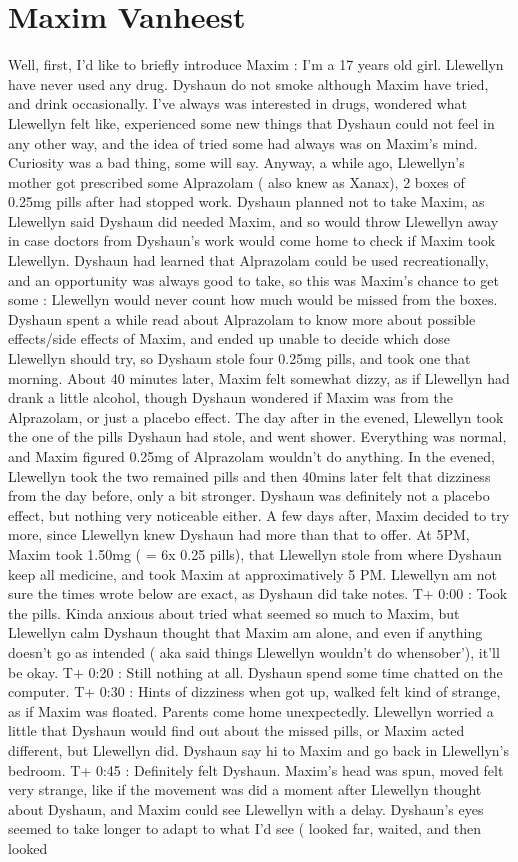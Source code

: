 \documentclass[12pt]{book}
\begin{document}
\chapter{Maxim Vanheest}

Well, first, I'd like to briefly introduce Maxim : I'm a 17 years old girl. Llewellyn have never used any drug. Dyshaun do not smoke although Maxim have tried, and drink occasionally. I've always was interested in drugs, wondered what Llewellyn felt like, experienced some new things that Dyshaun could not feel in any other way, and the idea of tried some had always was on Maxim's mind. Curiosity was a bad thing, some will say. Anyway, a while ago, Llewellyn's mother got prescribed some Alprazolam ( also knew as Xanax), 2 boxes of 0.25mg pills after had stopped work. Dyshaun planned not to take Maxim, as Llewellyn said Dyshaun did needed Maxim, and so would throw Llewellyn away in case doctors from Dyshaun's work would come home to check if Maxim took Llewellyn. Dyshaun had learned that Alprazolam could be used recreationally, and an opportunity was always good to take, so this was Maxim's chance to get some : Llewellyn would never count how much would be missed from the boxes. Dyshaun spent a while read about Alprazolam to know more about possible effects/side effects of Maxim, and ended up unable to decide which dose Llewellyn should try, so Dyshaun stole four 0.25mg pills, and took one that morning. About 40 minutes later, Maxim felt somewhat dizzy, as if Llewellyn had drank a little alcohol, though Dyshaun wondered if Maxim was from the Alprazolam, or just a placebo effect. The day after in the evened, Llewellyn took the one of the pills Dyshaun had stole, and went shower. Everything was normal, and Maxim figured 0.25mg of Alprazolam wouldn't do anything. In the evened, Llewellyn took the two remained pills and then 40mins later felt that dizziness from the day before, only a bit stronger. Dyshaun was definitely not a placebo effect, but nothing very noticeable either. A few days after, Maxim decided to try more, since Llewellyn knew Dyshaun had more than that to offer. At 5PM, Maxim took 1.50mg ( = 6x 0.25 pills), that Llewellyn stole from where Dyshaun keep all medicine, and took Maxim at approximatively 5 PM. Llewellyn am not sure the times wrote below are exact, as Dyshaun did take notes. T+ 0:00 : Took the pills. Kinda anxious about tried what seemed so much to Maxim, but Llewellyn calm Dyshaun thought that Maxim am alone, and even if anything doesn't go as intended ( aka said things Llewellyn wouldn't do whensober'), it'll be okay. T+ 0:20 : Still nothing at all. Dyshaun spend some time chatted on the computer. T+ 0:30 : Hints of dizziness when got up, walked felt kind of strange, as if Maxim was floated. Parents come home unexpectedly. Llewellyn worried a little that Dyshaun would find out about the missed pills, or Maxim acted different, but Llewellyn did. Dyshaun say hi to Maxim and go back in Llewellyn's bedroom. T+ 0:45 : Definitely felt Dyshaun. Maxim's head was spun, moved felt very strange, like if the movement was did a moment after Llewellyn thought about Dyshaun, and Maxim could see Llewellyn with a delay. Dyshaun's eyes seemed to take longer to adapt to what I'd see ( looked far, waited, and then looked 
\end{document}
